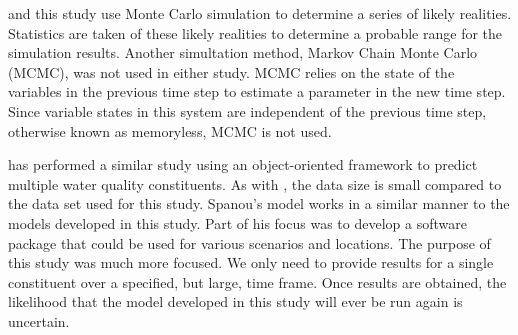 \citeauthor{Mueller2008} and this study use Monte Carlo simulation to determine a series of likely realities.  Statistics are taken of these likely realities to determine a probable range for the simulation results.  Another simultation method, Markov Chain Monte Carlo (MCMC), was not used in either study.  MCMC relies on the state of the variables in the previous time step to estimate a parameter in the new time step.  Since variable states in this system are independent of the previous time step, otherwise known as memoryless, MCMC is not used.

\citet{Spanou2001} has performed a similar study using an object-oriented framework to predict multiple water quality constituents.  As with \citet{Mueller2008}, the data size is small compared to the data set used for this study.  Spanou's model works in a similar manner to the models developed in this study.  Part of his focus was to develop a software package that could be used for various scenarios and locations.  The purpose of this study was much more focused.  We only need to provide results for a single constituent over a specified, but large, time frame.  Once results are obtained, the likelihood that the model developed in this study will ever be run again is uncertain.